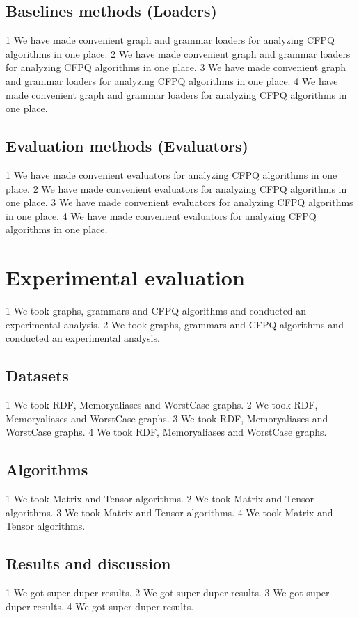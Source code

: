 \documentclass[sigconf]{acmart}
\begin{document}
\subsection{Baselines methods (Loaders)}
1 We have made convenient graph and grammar loaders for analyzing CFPQ algorithms in one place.
2 We have made convenient graph and grammar loaders for analyzing CFPQ algorithms in one place.
3 We have made convenient graph and grammar loaders for analyzing CFPQ algorithms in one place.
4 We have made convenient graph and grammar loaders for analyzing CFPQ algorithms in one place.

\subsection{Evaluation methods (Evaluators)}
1 We have made convenient evaluators for analyzing CFPQ algorithms in one place.
2 We have made convenient evaluators for analyzing CFPQ algorithms in one place.
3 We have made convenient evaluators for analyzing CFPQ algorithms in one place.
4 We have made convenient evaluators for analyzing CFPQ algorithms in one place.

\section{Experimental evaluation}
1 We took graphs, grammars and CFPQ algorithms and conducted an experimental analysis.
2 We took graphs, grammars and CFPQ algorithms and conducted an experimental analysis.

\subsection{Datasets}
1 We took RDF, Memoryaliases and WorstCase graphs.
2 We took RDF, Memoryaliases and WorstCase graphs.
3 We took RDF, Memoryaliases and WorstCase graphs.
4 We took RDF, Memoryaliases and WorstCase graphs.

\subsection{Algorithms}
1 We took Matrix and Tensor algorithms.
2 We took Matrix and Tensor algorithms.
3 We took Matrix and Tensor algorithms.
4 We took Matrix and Tensor algorithms.

\subsection{Results and discussion}
1 We got super duper results.
2 We got super duper results.
3 We got super duper results.
4 We got super duper results.
\end{document}
